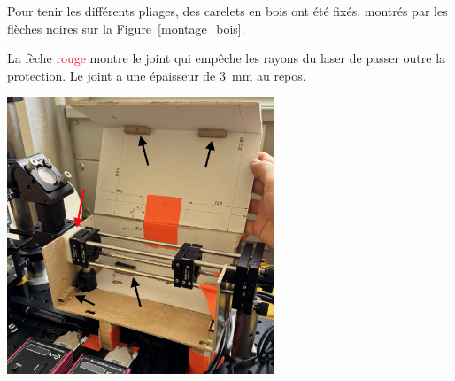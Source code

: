 \begin{minipage}{\textwidth}
    Pour tenir les différents pliages, des carelets en bois ont été fixés, montrés par les flèches noires sur la Figure~\ref{montage_bois}.

    La fèche \textcolor{red}{rouge} montre le joint qui empêche les rayons du laser de passer outre la protection. Le joint a une épaisseur de 3~mm au repos.
    \vspace{1em}
    \begin{center}
        \includegraphics[width=0.6\textwidth]{assets/figures/Protections_laser/Securite_mecanique/Protection_entree_laser/montage_bois.jpeg}
    \end{center}
    \label{montage_bois}
\end{minipage}
